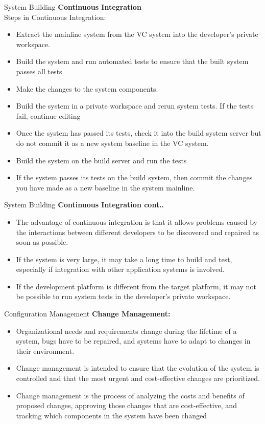 \documentclass{beamer}
\begin{document}
\begin{frame}{System Building}
	\textbf{Continuous Integration}\\
	Steps in Continuous Integration:
	\begin{itemize}
		\item Extract the mainline system from the VC system into the developer’s private workspace.
		\item Build the system and run automated tests to ensure that the built system passes all tests
		\item Make the changes to the system components.
		\item Build the system in a private workspace and rerun system tests. If the tests fail, continue editing
		\item Once the system has passed its tests, check it into the build system server but do not commit it as a 
		new system baseline in the VC system.
		\item Build the system on the build server and run the tests
		\item If the system passes its tests on the build system, then commit the changes you have made as a new 
		baseline in the system mainline.
	\end{itemize}
\end{frame}
\begin{frame}{System Building}
	\textbf{Continuous Integration cont..}\\
	\begin{itemize}
		\item The advantage of continuous integration is that it allows problems caused by the interactions between 
		different developers to be discovered and repaired as soon as possible.
		\item If the system is very large, it may take a long time to build and test, especially if integration with other 
		application systems is involved.
		\item If the development platform is different from the target platform, it may not be possible to run system 
		tests in the developer’s private workspace.
	\end{itemize}
\end{frame}
\begin{frame}{Configuration Management}
	\textbf{Change Management:}
	\begin{itemize}
		\item Organizational needs and requirements change during the lifetime of a system, bugs have to be 
		repaired, and systems have to adapt to changes in their environment.
		\item Change management is intended to ensure that the evolution of the system is controlled and that the 
		most urgent and cost-effective changes are prioritized.
		\item Change management is the process of analyzing the costs and benefits of proposed changes, approving 
		those changes that are cost-effective, and tracking which components in the system have been 
		changed

	\end{itemize}
\end{frame}
\end{document}
